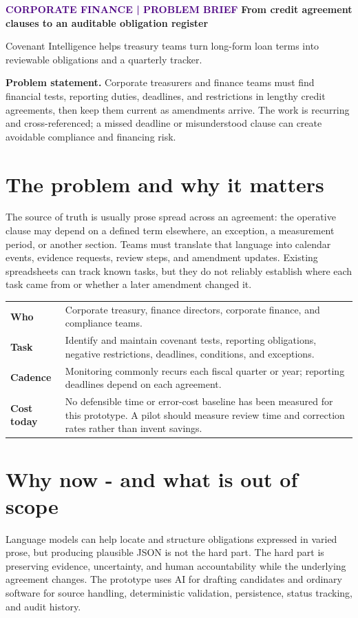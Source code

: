 \documentclass[10pt]{article}
\newcommand{\eyebrow}[1]{\textcolor{indigo}{\small\bfseries\MakeUppercase{#1}}}
\newcommand{\callout}[1]{\noindent\colorbox{pale}{\parbox{\dimexpr\linewidth-2\fboxsep}{#1}}}
\begin{document}
\eyebrow{Corporate finance | Problem brief}
\vspace{3pt}
{\LARGE\bfseries\color{ink} From credit agreement clauses to an auditable obligation register}\par
\vspace{3pt}
{\large\color{muted} Covenant Intelligence helps treasury teams turn long-form loan terms into reviewable obligations and a quarterly tracker.}\par
\vspace{7pt}
\callout{\textbf{Problem statement.} Corporate treasurers and finance teams must find financial tests, reporting duties, deadlines, and restrictions in lengthy credit agreements, then keep them current as amendments arrive. The work is recurring and cross-referenced; a missed deadline or misunderstood clause can create avoidable compliance and financing risk.}

\section{The problem and why it matters}
The source of truth is usually prose spread across an agreement: the operative clause may depend on a defined term elsewhere, an exception, a measurement period, or another section. Teams must translate that language into calendar events, evidence requests, review steps, and amendment updates. Existing spreadsheets can track known tasks, but they do not reliably establish where each task came from or whether a later amendment changed it.

\begin{tabularx}{\linewidth}{@{}>{\bfseries}p{1.35in}X@{}}
\toprule
Who & Corporate treasury, finance directors, corporate finance, and compliance teams.\\
Task & Identify and maintain covenant tests, reporting obligations, negative restrictions, deadlines, conditions, and exceptions.\\
Cadence & Monitoring commonly recurs each fiscal quarter or year; reporting deadlines depend on each agreement.\\
Cost today & No defensible time or error-cost baseline has been measured for this prototype. A pilot should measure review time and correction rates rather than invent savings.\\
\bottomrule
\end{tabularx}

\section{Why now - and what is out of scope}
Language models can help locate and structure obligations expressed in varied prose, but producing plausible JSON is not the hard part. The hard part is preserving evidence, uncertainty, and human accountability while the underlying agreement changes. The prototype uses AI for drafting candidates and ordinary software for source handling, deterministic validation, persistence, status tracking, and audit history.
\end{document}
